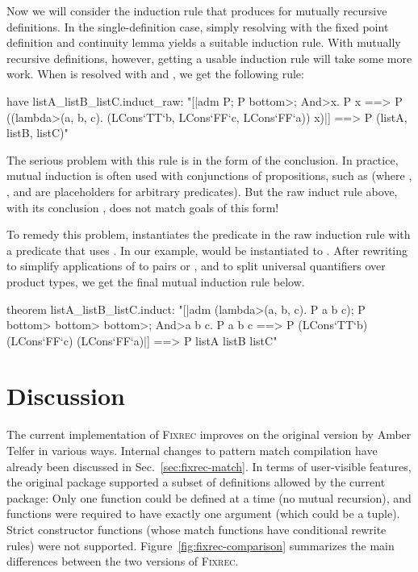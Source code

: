 Now we will consider the induction rule that {\fixrec} produces for mutually recursive definitions. In the single-definition case, simply resolving  with the fixed point definition and continuity lemma yields a suitable induction rule. With mutually recursive definitions, however, getting a usable induction rule will take some more work. When  is resolved with  and , we get the following rule:
%
\begin{isacode}
have listA_listB_listC.induct_raw:
  "[|adm P; P \<bottom>;
    \<And>x. P x ==> P ((\<lambda>(a, b, c). (LCons`TT`b, LCons`FF`c, LCons`FF`a)) x)|]
    ==> P (listA, listB, listC)"
\end{isacode}
%
The serious problem with this rule is in the form of the conclusion. In practice, mutual induction is often used with conjunctions of propositions, such as  (where , , and  are placeholders for arbitrary predicates). But the raw induct rule above, with its conclusion , does not match goals of this form!

To remedy this problem, {\fixrec} instantiates the predicate  in the raw induction rule with a predicate that uses . In our example,  would be instantiated to . After rewriting to simplify applications of  to pairs or , and to split universal quantifiers over product types, we get the final mutual induction rule below.
%
\begin{isacode}
theorem listA_listB_listC.induct:
  "[|adm (\<lambda>(a, b, c). P a b c); P \<bottom> \<bottom> \<bottom>;
    \<And>a b c. P a b c ==> P (LCons`TT`b) (LCons`FF`c) (LCons`FF`a)|]
    ==> P listA listB listC"
\end{isacode}
\unmedskip

\section{Discussion}
\label{sec:fixrec-conclusion}

The current implementation of \textsc{Fixrec} improves on the original version by Amber Telfer \cite{Telfer04} in various ways. Internal changes to pattern match compilation have already been discussed in Sec.~\ref{sec:fixrec-match}. In terms of user-visible features,
the original package supported a subset of definitions allowed by the current package: Only one function could be defined at a time (no mutual recursion), and functions were required to have exactly one argument (which could be a tuple). Strict constructor functions (whose match functions have conditional rewrite rules) were not supported. Figure~\ref{fig:fixrec-comparison} summarizes the main differences between the two versions of \textsc{Fixrec}.

